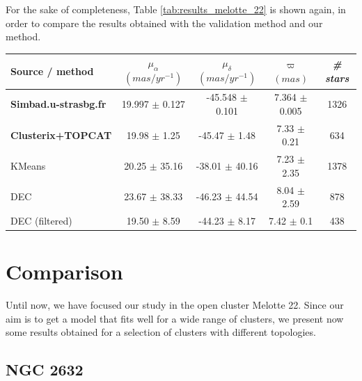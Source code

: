 \documentclass[11pt, a4paper, english]{book}
\begin{document}
For the sake of completeness, Table \ref{tab:results_melotte_22} is shown again,
in order to compare the results obtained with the validation method and our method.

\begin{table}[h!]
  \begin{center}
    \begin{tabular}{l|c|c|c|c}
      \textbf{Source / method} & \textbf{$\mu_{\alpha}$ $(mas/yr^{-1})$} & \textbf{$\mu_{\delta}$ $(mas/yr^{-1})$} & \textbf{$\varpi$ $(mas)$} & \emph{\# stars} \\
      \hline
      \textbf{Simbad.u-strasbg.fr} & 19.997 $\pm$ 0.127 & -45.548 $\pm$ 0.101 & 7.364 $\pm$ 0.005 & 1326 \\
      \textbf{Clusterix+TOPCAT} & 19.98 $\pm$ 1.25 & -45.47 $\pm$ 1.48 & 7.33 $\pm$ 0.21 & 634 \\
      KMeans & 20.25 $\pm$ 35.16 & -38.01 $\pm$ 40.16 & 7.23 $\pm$ 2.35 & 1378 \\
      DEC & 23.67 $\pm$ 38.33 & -46.23 $\pm$ 44.54 & 8.04 $\pm$ 2.59 & 878 \\
      DEC (filtered) & 19.50 $\pm$ 8.59 & -44.23 $\pm$ 8.17 & 7.42 $\pm$ 0.1 & 438 \\
    \end{tabular}
  \end{center}
\end{table}

\section{Comparison}

Until now, we have focused our study in the open cluster Melotte 22.
Since our aim is to get a model that fits well for a wide range of clusters,
we present now some results obtained for a selection of clusters with different topologies.

\pagebreak


\subsection{NGC 2632}
\end{document}
